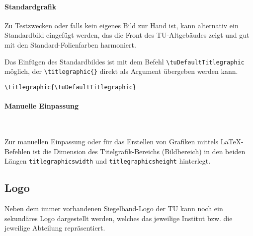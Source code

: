 \paragraph{Standardgrafik}

Zu Testzwecken oder falls kein eigenes Bild zur Hand ist,
kann alternativ ein Standardbild eingefügt werden, das die Front
des TU-Altgebäudes zeigt und gut mit den Standard-Folienfarben harmoniert.

Das Einfügen des Standardbildes ist mit dem Befehl
\linebreak\lstinline{\tuDefaultTitlegraphic} möglich,
der \lstinline!\titlegraphic{}! direkt als Argument übergeben werden kann.

\begin{example}
\begin{lstlisting}
\titlegraphic{\tuDefaultTitlegraphic}
\end{lstlisting}
\end{example}


\paragraph{Manuelle Einpassung}\hfill

\begin{Declaration}
  \\
\end{Declaration}

Zur manuellen Einpassung oder für das Erstellen von Grafiken mittels
\LaTeX-Befehlen ist die Dimension des Titelgrafik-Bereichs (Bildbereich) in den
beiden Längen \lstinline{titlegraphicswidth} und \lstinline{titlegraphicsheight}
hinterlegt.


\subsection{Logo}

Neben dem immer vorhandenen Siegelband-Logo der TU kann noch ein sekundäres Logo
dargestellt werden, welches das jeweilige Institut bzw. die jeweilige Abteilung
repräsentiert.

\begin{Declaration}
\end{Declaration}

